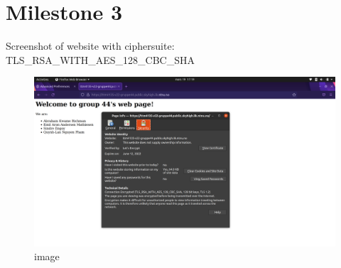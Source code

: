 \hypertarget{milestone-3}{%
\section{Milestone 3}\label{milestone-3}}

Screenshot of website with ciphersuite:
TLS\_RSA\_WITH\_AES\_128\_CBC\_SHA

\begin{figure}
\centering
\includegraphics{./AES128-SHA.png}
\caption{image}
\end{figure}
